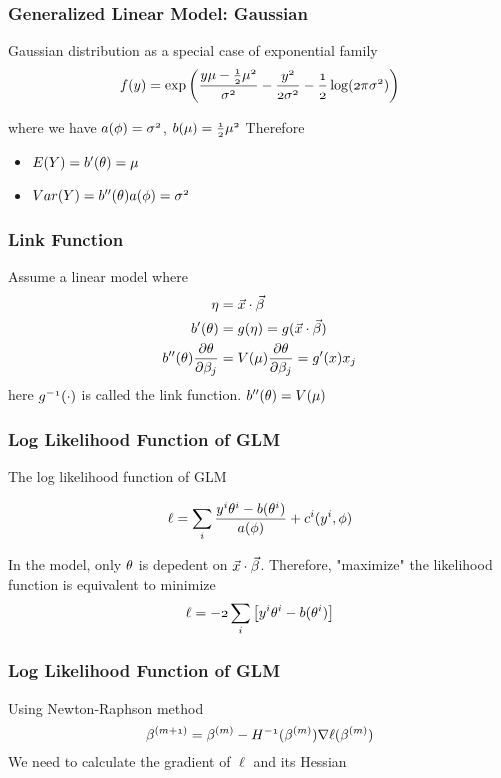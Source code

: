 \documentclass[notheorems, aspectratio=54]{beamer}
\begin{document}
\begin{frame}

\frametitle{Generalized Linear Model: Gaussian}
Gaussian distribution as a special case of exponential family 
$$
\mathnormal{f(y)}=\exp\mathnormal{\left( \frac{y\mu-\frac{1}{2}\mu^2}{\sigma^2}-\frac{y^2}{2\sigma^2}-\frac{1}{2}\log(2\pi\sigma^2)\right)}
$$

where we have $\mathnormal{a(\phi)=\sigma^2}$, $\mathnormal{b(\mu)=\frac{1}{2}\mu^2}$
Therefore
\begin{itemize}
\item $\mathnormal{E(Y)}=\mathnormal{b'(\theta)=\mu}$
\item $\mathnormal{Var(Y)}=\mathnormal{b''(\theta)a(\phi)=\sigma^2}$
\end{itemize}
\end{frame}

\begin{frame}
\frametitle{Link Function}
Assume a linear model where 
\begin{align*}
\mathnormal{\eta}&=\mathnormal{\vec{x}\cdot\vec{\beta}}\\
\mathnormal{b'(\theta)}&=\mathnormal{g(\eta)}=\mathnormal{g(\vec{x}\cdot\vec{\beta})}\\ 
\mathnormal{b''(\theta)}\frac{\partial \theta}{\partial \beta_j}&=\mathnormal{V(\mu)}\frac{\partial \theta}{\partial \beta_j}=\mathnormal{g'(x)x_j}
\end{align*}
here $\mathnormal{g^{-1}(\cdot)}$ is called the link function. $\mathnormal{b''(\theta)=V(\mu)}$

\end{frame}

\begin{frame}
\frametitle{Log Likelihood Function of GLM}
The log likelihood function of GLM

$$\mathnormal{\ell}=\mathnormal{\sum_{i}\frac{y^i\theta^i-b(\theta^i)}{a(\phi)}+c^i(y^i, \phi)}$$

In the model, only $\mathnormal{\theta}$ is depedent on $\mathnormal{\vec{x}\cdot\vec{\beta}}$. Therefore, "maximize" the likelihood function is equivalent to minimize  
$$\mathnormal{\ell=-2\sum_{i} \left[y^i\theta^i-b(\theta^i)\right]}$$

\end{frame}

\begin{frame}
\frametitle{Log Likelihood Function of GLM}

Using Newton-Raphson method
$$
\mathnormal{\beta^{(m+1)}}=\mathnormal{\beta^{(m)}-H^{-1}(\beta^{(m)})\nabla \ell(\beta^{(m)})}
$$
We need to calculate the gradient of $\ell$ and its Hessian
\end{frame}
\end{document}
